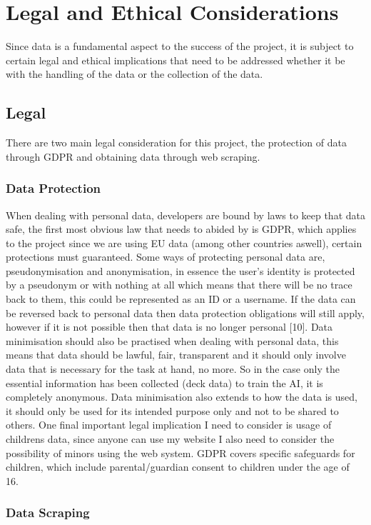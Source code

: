 \documentclass{report} %
\begin{document}
	\chapter{Legal and Ethical Considerations}
	Since data is a fundamental aspect to the success of the project, it is subject to certain legal and ethical implications that need to be addressed whether it be with the handling of the data or the collection of the data.
	\section{Legal}
	There are two main legal consideration for this project, the protection of data through GDPR and obtaining data through web scraping.
	\subsection{Data Protection}
	When dealing with personal data, developers are bound by laws to keep that data safe, the first most obvious law that needs to abided by is GDPR, which applies to the project since we are using EU data (among other countries aswell), certain protections must guaranteed. Some ways of protecting personal data are, pseudonymisation and anonymisation, in essence the user’s identity is protected by a pseudonym or with nothing at all which means that there will be no trace back to them, this could be represented as an ID or a username. If the data can be reversed back to personal data then data protection obligations will still apply, however if it is not possible then that data is no longer personal [10]. Data minimisation should also be practised when dealing with personal data, this means that data should be lawful, fair, transparent and it should only involve data that is necessary for the task at hand, no more. So in the case only the essential information has been collected (deck data) to train the AI, it is completely anonymous. Data minimisation also extends to how the data is used, it should only be used for its intended purpose only and not to be shared to others. One final important legal implication I need to consider is usage of childrens data, since anyone can use my website I also need to consider the possibility of minors using the web system. GDPR covers specific safeguards for children, which include parental/guardian consent to children under the age of 16.

	\subsection{Data Scraping}
	
\end{document}
